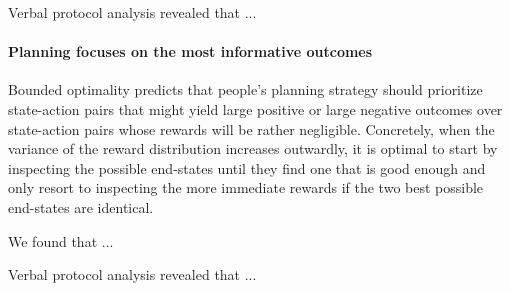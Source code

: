 Verbal protocol analysis revealed that ...

\paragraph{Planning focuses on the most informative outcomes}
Bounded optimality predicts that people's planning strategy should prioritize state-action pairs that might yield large positive or large negative outcomes over state-action pairs whose rewards will be rather negligible. Concretely, when the variance of the reward distribution increases outwardly, it is optimal to start by inspecting the possible end-states until they find one that is good enough and only resort to inspecting the more immediate rewards if the two best possible end-states are identical.

We found that ...



Verbal protocol analysis revealed that ...

